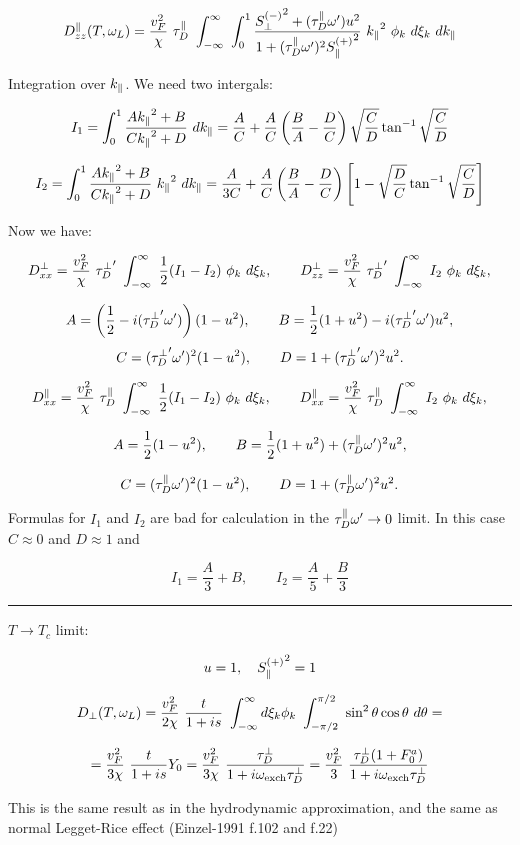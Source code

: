 \documentclass[a4paper]{article}
\begin{document}
$$
D^\parallel_{zz}(T, \ol) =
  \frac{v_F^2}{\chi}\ \t
  \ \int_{-\infty}^{\infty}\ \int_{0}^{1}
  \frac{\sm + (\t\op)u^2 }{1+(\t\op)^2\sp}
  \  \kpa^2\ \phi_k\ d\xi_k\ d\kpa
$$

\eject
Integration over $\kpa$. We need two intergals:

$$
I_1 = \int_0^1 \frac{A\kpa^2 + B}{C \kpa^2 + D}\ d\kpa = 
\frac{A}{C} + \frac{A}{C}\left(\frac{B}{A} - \frac{D}{C}\right)
\sqrt{\frac{C}{D}}\tan^{-1}\sqrt{\frac{C}{D}}
$$

$$
I_2 = \int_0^1 \frac{A\kpa^2 + B}{C \kpa^2 + D}\ \kpa^2\ d\kpa =
\frac{A}{3C} + \frac{A}{C}\left(\frac{B}{A} - \frac{D}{C}\right)
\left[ 1 - \sqrt{\frac{D}{C}}\tan^{-1}\sqrt{\frac{C}{D}} \right]
$$

Now we have:

$$
D^\perp_{xx} =
  \frac{v_F^2}{\chi}\ \tp
  \ \int_{-\infty}^{\infty}
  \ \frac12 (I_1-I_2)\ \phi_k\ d\xi_k,
\qquad
D^\perp_{zz} =
  \frac{v_F^2}{\chi}\ \tp
  \ \int_{-\infty}^{\infty}
  \ I_2\ \phi_k\ d\xi_k,
$$

$$
A = \left(\frac12 - i(\tp\op)\right) (1-u^2), \qquad
B = \frac12 (1+u^2) - i(\tp\op) u^2,
$$
$$
C = (\tp\op)^2 (1-u^2),\qquad
D = 1 + (\tp\op)^2 u^2.
$$

$$
D^\parallel_{xx} =
  \frac{v_F^2}{\chi}\ \t
  \ \int_{-\infty}^{\infty}
  \ \frac12 (I_1-I_2)\ \phi_k\ d\xi_k,
\qquad
D^\parallel_{xx} =
  \frac{v_F^2}{\chi}\ \t
  \ \int_{-\infty}^{\infty}
  \ I_2\ \phi_k\ d\xi_k,
$$

$$
A = \frac12 (1-u^2), \qquad
B = \frac12 (1+u^2) + (\t\op)^2 u^2,
$$

$$
C = (\t\op)^2 (1-u^2),\qquad
D = 1 + (\t\op)^2 u^2.
$$

Formulas for $I_1$ and $I_2$ are bad for calculation in the $\t\op \to
0$ limit. In this case $C \approx 0$ and $D \approx 1$ and

$$
I_1 = \frac{A}{3}+B,\qquad
I_2 = \frac{A}{5}+\frac{B}{3}
$$

\hrule\medskip

$T\rightarrow T_c$ limit:

$$
u=1,\quad
{\sp} = 1
$$

$$
D_\perp (T, \ol) =
  \frac{v_F^2}{2\chi}
  \ \frac{t}{1+is}
  \ \int_{-\infty}^{\infty}
  d\xi_k\phi_k
  \ \int_{-\pi/2}^{\pi/2}
  \  \sin^2\theta \cos\theta \ d\theta =
$$

$$
  = \frac{v_F^2}{3\chi} \ \frac{t}{1+is} Y_0
  = \frac{v_F^2}{3\chi} \ \frac{\tdp}{1+i\oe\tdp}
  = \frac{v_F^2}{3}\ \frac{\tdp (1+F_0^a)}{1+i\oe\tdp}
$$

This is the same result as in the hydrodynamic approximation,
and the same as normal Legget-Rice effect (Einzel-1991 f.102 and f.22)
\end{document}
